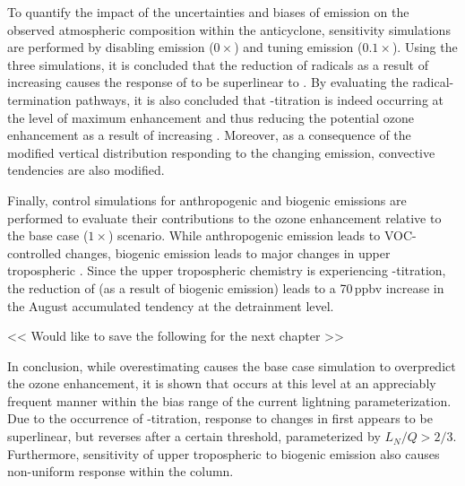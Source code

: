 To quantify the impact of the uncertainties and biases of {\lnox} emission on the observed atmospheric composition
within the anticyclone, sensitivity simulations are performed by disabling emission ($0\times$) and tuning emission
($0.1\times$). Using the three simulations, it is concluded that the reduction of  radicals as a result of
increasing  causes the response of  to be superlinear to {\lnox}. By evaluating the
radical-termination pathways, it is also concluded that -titration is indeed occurring at the level of
maximum  enhancement and thus reducing the potential ozone enhancement as a result of increasing
{\lnox}. Moreover, as a consequence of the modified vertical distribution responding to the changing {\lnox} emission,
convective tendencies are also modified.

Finally, control simulations for anthropogenic and biogenic emissions are performed to evaluate their contributions
to the ozone enhancement relative to the base case ($1\times$) scenario. While anthropogenic emission leads to
VOC-controlled changes, biogenic emission leads to major changes in upper tropospheric . Since the
upper tropospheric chemistry is experiencing -titration, the reduction of  (as a result of
biogenic emission) leads to a 70\,\unit{ppbv} increase in the August accumulated tendency at the detrainment level.

<< Would like to save the following for the next chapter >>

In conclusion, while overestimating {\lnox} causes the base case simulation to overpredict the ozone enhancement,
it is shown that {\lnox} occurs at this level at an appreciably frequent manner within the bias range of the current
lightning parameterization. Due to the occurrence of -titration, response to changes in {\lnox} 
first appears to be superlinear, but reverses after a certain threshold, parameterized by $L_N/Q>2/3$. Furthermore,
sensitivity of upper tropospheric  to biogenic emission also causes non-uniform response within
the column.